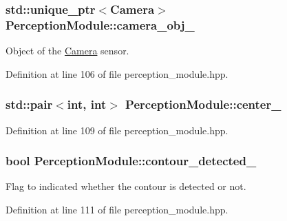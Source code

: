 \subsubsection[{\texorpdfstring{camera\+\_\+obj\+\_\+}{camera_obj_}}]{\setlength{\rightskip}{0pt plus 5cm}std\+::unique\+\_\+ptr$<${\bf Camera}$>$ Perception\+Module\+::camera\+\_\+obj\+\_\+\hspace{0.3cm}{\ttfamily [private]}}\hypertarget{class_perception_module_af5250548d1ab0ab5574aa17fd99104e4}{}\label{class_perception_module_af5250548d1ab0ab5574aa17fd99104e4}


Object of the \hyperlink{class_camera}{Camera} sensor. 



Definition at line 106 of file perception\+\_\+module.\+hpp.

\subsubsection[{\texorpdfstring{center\+\_\+}{center_}}]{\setlength{\rightskip}{0pt plus 5cm}std\+::pair$<$int, int$>$ Perception\+Module\+::center\+\_\+\hspace{0.3cm}{\ttfamily [private]}}\hypertarget{class_perception_module_a67ea0e9f666e33bce8d81bf22098d168}{}\label{class_perception_module_a67ea0e9f666e33bce8d81bf22098d168}


Definition at line 109 of file perception\+\_\+module.\+hpp.

\subsubsection[{\texorpdfstring{contour\+\_\+detected\+\_\+}{contour_detected_}}]{\setlength{\rightskip}{0pt plus 5cm}bool Perception\+Module\+::contour\+\_\+detected\+\_\+\hspace{0.3cm}{\ttfamily [private]}}\hypertarget{class_perception_module_ab547d968284f6ab18a01b9776c54f38a}{}\label{class_perception_module_ab547d968284f6ab18a01b9776c54f38a}
Flag to indicated whether the contour is detected or not. 

Definition at line 111 of file perception\+\_\+module.\+hpp.

